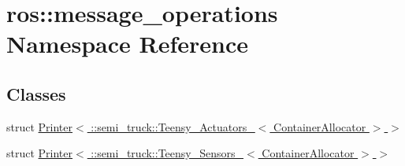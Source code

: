 \hypertarget{namespaceros_1_1message__operations}{}\section{ros\+:\+:message\+\_\+operations Namespace Reference}
\label{namespaceros_1_1message__operations}
\subsection*{Classes}
\begin{DoxyCompactItemize}
\item 
struct \hyperlink{structros_1_1message__operations_1_1_printer_3_01_1_1semi__truck_1_1_teensy___actuators___3_01_container_allocator_01_4_01_4}{Printer$<$ \+::semi\+\_\+truck\+::\+Teensy\+\_\+\+Actuators\+\_\+$<$ Container\+Allocator $>$ $>$}
\item 
struct \hyperlink{structros_1_1message__operations_1_1_printer_3_01_1_1semi__truck_1_1_teensy___sensors___3_01_container_allocator_01_4_01_4}{Printer$<$ \+::semi\+\_\+truck\+::\+Teensy\+\_\+\+Sensors\+\_\+$<$ Container\+Allocator $>$ $>$}
\end{DoxyCompactItemize}
